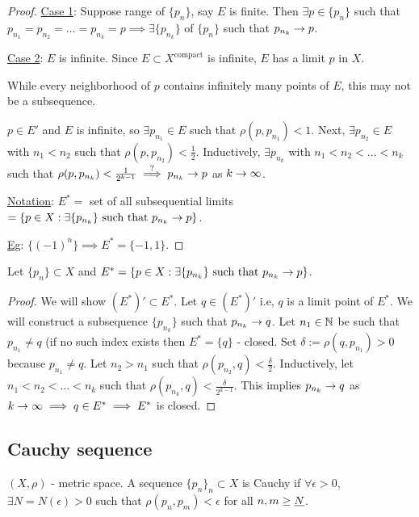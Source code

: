 \documentclass[]{article}
\begin{document}
\begin{proof}
	\ul{Case 1}: Suppose range of $\{p_n\}$, say $E$ is finite.
	Then $\exists p\in\{p_n\}$ such that $p_{n_1} = p_{n_2} = \dots = p_{n_k} = p \implies \exists \{p_{n_k}\}$ of $\{p_n\}$ such that $p_{n_k}\rightarrow p$.

	\ul{Case 2}: $E$ is infinite.
	Since $E\subset X^{\text{compact}}$ is infinite, $E$ has a limit $p$ in $X$.
	\begin{note}
		While every neighborhood of $p$ contains infinitely many points of $E$, this may not be a subsequence.
	\end{note}
	$p\in E'$ and $E$ is infinite, so $\exists p_{n_1}\in E$ such that $\rho(p,p_{n_1}) < 1$.
	Next, $\exists p_{n_2}\in E$ with $n_1 < n_2$ such that $\rho(p,p_{n_2}) < \frac{1}{2}$.
	Inductively, $\exists p_{n_k}$ with $n_1 < n_2 < \dots < n_k$ such that $\rho(p,p_{n_k}) < \frac{1}{2^{k-1}} \overset{?}{\implies} p_{n_k} \rightarrow p$ as $k\rightarrow\infty$.

	\ul{Notation}: $E^* = $ set of all subsequential limits $ = \{p\in X : \exists\{ p_{n_k} \}\text{ such that }p_{n_k} \rightarrow p\}$.
	
	\ul{Eg}: $\{(-1)^n\} \implies E^* = \{-1,1\}$.
\end{proof}
\begin{theorem}
	Let $\{p_n\}\subset X$ and $E^* = \{p\in X: \exists \{ p_{n_k}\} \text{ such that } p_{n_k}\rightarrow p\}$.
\end{theorem}
\begin{proof}
	We will show $(E^*)' \subset E^*$.
	Let $q\in (E^*)'$ i.e, $q$ is a limit point of $E^*$.
	We will construct a subsequence $\{p_{n_k}\}$ such that $p_{n_k} \rightarrow q$.
	Let $n_1\in\mathbb{N}$ be such that $p_{n_1}\neq q$ (if no such index exists then $E^* = \{q\}$ - closed.
	Set $\delta := \rho(q,p_{n_1}) > 0$ because $p_{n_1}\neq q$.
	Let $n_2 > n_1$ such that $\rho(p_{n_2},q) < \frac{\delta}{2}$.
	Inductively, let $n_1 < n_2 < \dots < n_k$ such that $\rho(p_{n_k},q) < \frac{\delta}{2^{k-1}}$.
	This implies $p_{n_k}\rightarrow q$ as $k\rightarrow\infty \implies q\in E^* \implies E^*$ is closed.
\end{proof}

\subsection{Cauchy sequence}

\begin{definition}
	$(X,\rho)$ - metric space. A sequence $\{p_n\}_n\subset X$ is Cauchy if $\forall \epsilon>0$, $\exists N = N(\epsilon)>0$ such that $\rho(p_n,p_m)<\epsilon$ for all $n,m\geq \underline{N}$.
\end{definition}
\end{document}
